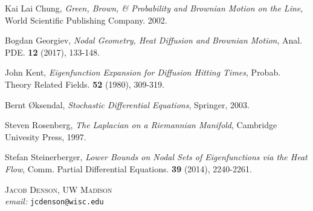 \documentclass[12pt]{article}
\newtheorem{corollary}[theorem]{Corollary}
\newcommand*{\R}{\mathbb{R}}
\begin{document}
\begin{comment}
The proof will show one can generalize this result to $\Sigma$ formed from a finite union of embedded manifolds admissable up to a distance $\lambda^{-1}$, provided these manifolds are sufficiently transversal to one another. This leads to a new proof of a class result due to Hayman.

\begin{corollary}
    There exists $c \geq 1/900$ such that if $\Omega \subset \R^2$ is simply connected with \emph{inradius} $\rho$ ($\rho$ is the largest radius of a ball contained in $\Omega$), $\lambda_1(\Omega) \geq c/\rho^2$.
\end{corollary}

TODO: DO WE EXPECT DENSITY OF THE NODAL SET FOR LARGE $\lambda$, i.e. $\lambda^{-1}$ density.

\end{comment}

\begin{thebibliography}{3}

    Kai Lai Chung,
    \emph{Green, Brown, \& Probability and Brownian Motion on the Line},
    World Scientific Publishing Company. 2002.

    Bogdan Georgiev,
    \emph{Nodal Geometry, Heat Diffusion and Brownian Motion},
    Anal. PDE. {\bf 12} (2017), 133-148.

    John Kent,
    \emph{Eigenfunction Expansion for Diffusion Hitting Times},
    Probab. Theory Related Fields. {\bf 52} (1980), 309-319.

    Bernt {\O}ksendal,
    \emph{Stochastic Differential Equations},
    Springer, 2003.

    Steven Rosenberg,
    \emph{The Laplacian on a Riemannian Manifold},
    Cambridge Univesity Press, 1997.

    Stefan Steinerberger,
    \emph{Lower Bounds on Nodal Sets of Eigenfunctions via the Heat Flow},
    Comm. Partial Differential Equations. {\bf 39} (2014), 2240-2261.

\end{thebibliography}

\noindent \textsc{Jacob Denson, UW Madison}\\
\textit{email:} \texttt{jcdenson@wisc.edu}
\end{document}
